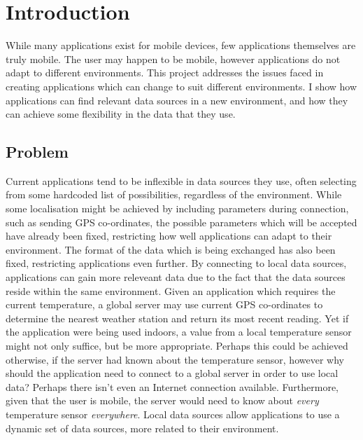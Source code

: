 \documentclass[12pt,twoside,notitlepage]{report}
\begin{document}
\bigskip
\bigskip
{}

\bigskip
\bigskip
{}

\cleardoublepage

\tableofcontents

\listoffigures

\newpage


\cleardoublepage        %

\setcounter{page}{1}
\pagestyle{headings}

\chapter{Introduction}

While many applications exist for mobile devices, few applications themselves are truly mobile. 
The user may happen to be mobile, however applications do not adapt to different environments. 
This project addresses the issues faced in creating applications which can change to suit different environments. 
I show how applications can find relevant data sources in a new environment, and how they can achieve some flexibility in the data that they use. 

\section{Problem}

Current applications tend to be inflexible in data sources they use, often selecting from some hardcoded list of possibilities, regardless of the environment. 
While some localisation might be achieved by including parameters during connection, such as sending GPS co-ordinates, the possible parameters which will be accepted have already been fixed, restricting how well applications can adapt to their environment. 
The format of the data which is being exchanged has also been fixed, restricting applications even further.
By connecting to local data sources, applications can gain more releveant data due to the fact that the data sources reside within the same environment.
Given an application which requires the current temperature, a global server may use current GPS co-ordinates to determine the nearest weather station and return its most recent reading. 
Yet if the application were being used indoors, a value from a local temperature sensor might not only suffice, but be more appropriate. 
Perhaps this could be achieved otherwise, if the server had known about the temperature sensor, however why should the application need to connect to a global server in order to use local data? Perhaps there isn't even an Internet connection available. 
Furthermore, given that the user is mobile, the server would need to know about {\sl every} temperature sensor {\sl everywhere}. 
Local data sources allow applications to use a dynamic set of data sources, more related to their environment. 
\end{document}
